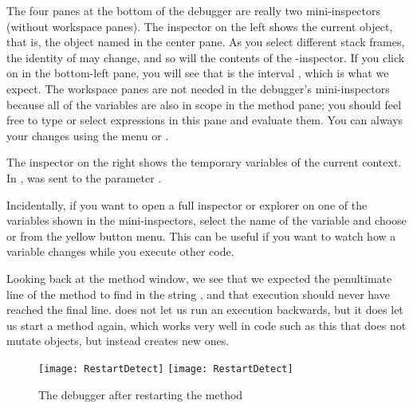 \documentclass[a4paper,10pt,twoside]{book}
\begin{document}
The four panes at the bottom of the debugger are really two mini-inspectors (without workspace panes).
The inspector on the left shows the current object, that is, the object named \self in the center pane.
As you select different stack frames, the identity of \self may change, and so will the contents of the 
\self{}-inspector.
If you click on \self in the bottom-left pane, you will see that \self is the interval , which is what we expect.
The workspace panes are not needed in the debugger's mini-inspectors because all of the variables are also in scope in the method pane; you should feel free to type or select expressions in this pane and evaluate them.  
You can always  your changes using the menu or . 

The inspector on the right shows the temporary variables of the current context.
In ,
 was sent to the parameter .


Incidentally, if you want to open a full inspector or explorer on one of the variables shown in the mini-inspectors, select the name of the variable and choose  or  from the yellow button menu.  
This can be useful if you want to watch how a variable changes while you execute other code. 

Looking back at the method window, we see that we expected the penultimate line of the method to find  in the string , and that execution should never have reached the final line.
\sq does not let us run an execution backwards, but it does let us start a method again, which works very well in code such as this that does not mutate objects, but instead creates new ones.  


\begin{figure}[btp]
	\begin{center}
	\ifluluelse
		{\texttt{[image: RestartDetect]}}
		{\texttt{[image: RestartDetect]}}
	\end{center}
	\caption{The debugger after restarting the  method}
	\label{fig:RestartDetect}
\end{figure}
\end{document}
